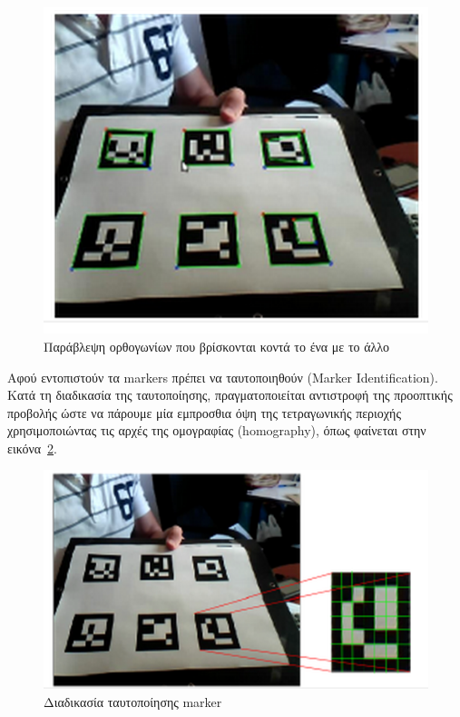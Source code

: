 \begin{figure}[H]
    \centering
    \includegraphics[scale=0.6, angle=0]{Files/Figures/aruco4.png}
    \caption[Παράβλεψη ορθογωνίων που βρίσκονται κοντά το ένα με το άλλο]{Παράβλεψη ορθογωνίων που βρίσκονται κοντά το ένα με το άλλο}
    \label{fig:aruco4}
\end{figure}



Αφού εντοπιστούν τα markers πρέπει να ταυτοποιηθούν (Marker Identification). Κατά τη διαδικασία της ταυτοποίησης, πραγματοποιείται αντιστροφή της προοπτικής προβολής ώστε να πάρουμε μία εμπροσθια όψη της τετραγωνικής περιοχής χρησιμοποιώντας τις αρχές της ομογραφίας (homography), όπως φαίνεται στην εικόνα~\ref{fig:aruco5}.


\begin{figure}[H]
    \centering
    \includegraphics[scale=0.6, angle=0]{Files/Figures/aruco5.png}
    \caption[Διαδικασία ταυτοποίησης marker]{Διαδικασία ταυτοποίησης marker}
    \label{fig:aruco5}
\end{figure}



